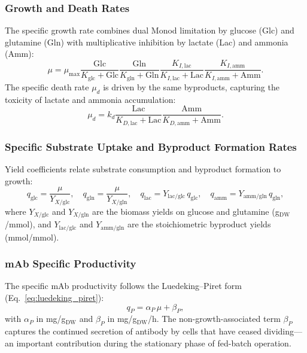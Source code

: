 \subsubsection*{Growth and Death Rates}

The specific growth rate combines dual Monod limitation by glucose (Glc) and
glutamine (Gln) with multiplicative inhibition by lactate (Lac) and
ammonia (Amm):
\begin{equation}\label{eq:cho_mu}
  \mu = \mu_{\max}
        \frac{\text{Glc}}{K_{\text{glc}} + \text{Glc}}
        \frac{\text{Gln}}{K_{\text{gln}} + \text{Gln}}
        \frac{K_{I,\text{lac}}}{K_{I,\text{lac}} + \text{Lac}}
        \frac{K_{I,\text{amm}}}{K_{I,\text{amm}} + \text{Amm}}.
\end{equation}
The specific death rate $\mu_d$ is driven by the same byproducts, capturing
the toxicity of lactate and ammonia accumulation:
\begin{equation}\label{eq:cho_mud}
  \mu_d = k_d
          \frac{\text{Lac}}{K_{D,\text{lac}} + \text{Lac}}
          \frac{\text{Amm}}{K_{D,\text{amm}} + \text{Amm}}.
\end{equation}

\subsubsection*{Specific Substrate Uptake and Byproduct Formation Rates}

Yield coefficients relate substrate consumption and byproduct formation to
growth:
\begin{equation}\label{eq:cho_uptake}
  q_{\text{glc}} = \frac{\mu}{Y_{X/\text{glc}}}, \quad
  q_{\text{gln}} = \frac{\mu}{Y_{X/\text{gln}}}, \quad
  q_{\text{lac}} = Y_{\text{lac}/\text{glc}}\,q_{\text{glc}}, \quad
  q_{\text{amm}} = Y_{\text{amm}/\text{gln}}\,q_{\text{gln}},
\end{equation}
where $Y_{X/\text{glc}}$ and $Y_{X/\text{gln}}$ are the biomass yields on
glucose and glutamine (g$_{\text{DW}}$/mmol), and $Y_{\text{lac}/\text{glc}}$
and $Y_{\text{amm}/\text{gln}}$ are the stoichiometric byproduct yields
(mmol/mmol).

\subsubsection*{mAb Specific Productivity}

The specific mAb productivity follows the Luedeking--Piret form
(Eq.~\ref{eq:luedeking_piret}):
\begin{equation}\label{eq:cho_qp}
  q_P = \alpha_P\,\mu + \beta_P,
\end{equation}
with $\alpha_P$ in mg/g$_{\text{DW}}$ and $\beta_P$ in mg/g$_{\text{DW}}$/h.
The non-growth-associated term $\beta_P$ captures the continued secretion of
antibody by cells that have ceased dividing---an important contribution during
the stationary phase of fed-batch operation.

